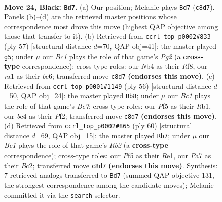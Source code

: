 \documentclass[11pt]{article}
\begin{document}
\clearpage

\begin{figure}[p]\centering
\begin{subfigure}{0.46\textwidth}\centering
\resizebox{\linewidth}{!}{%
\newchessgame
\chessboard[
  setfen={r1b4k/ppb3pp/5n2/P4p2/1nB2P2/1P2P1P1/8/RNB2RK1 b - - 8 24},
  showmover=false,
  pgfstyle=straightmove, color=movearrow, markmove={c8-d7}
]}
\caption{}
\end{subfigure}\hfill
\begin{subfigure}{0.46\textwidth}\centering
\resizebox{\linewidth}{!}{%
\newchessgame
\chessboard[
  setfen={5rk1/5ppp/1pB1p3/pPb1P3/5n2/2P4P/2P3P1/R3R2K b - - 1 29},
  showmover=false,
  pgfstyle=straightmove, color=movearrow, markmove={g7-g5}
]}
\caption{}
\end{subfigure}
\\[4pt]
\begin{subfigure}{0.46\textwidth}\centering
\resizebox{\linewidth}{!}{%
\newchessgame
\chessboard[
  setfen={r1b5/p1B1pr1k/5b1p/P1NR1p2/6p1/4P3/5PPP/1R4K1 w - - 1 29},
  showmover=false,
  pgfstyle=straightmove, color=movearrow, markmove={c7-b8}
]}
\caption{}
\end{subfigure}\hfill
\begin{subfigure}{0.46\textwidth}\centering
\resizebox{\linewidth}{!}{%
\newchessgame
\chessboard[
  setfen={r3r1k1/p2n1p2/2ppb1p1/7p/P3P2P/2K1B3/1RB2PP1/4R3 w - - 0 31},
  showmover=false,
  pgfstyle=straightmove, color=movearrow, markmove={b2-b7}
]}
\caption{}
\end{subfigure}
\caption{\textbf{Move 24, Black: \texttt{Bd7}.} (a) Our position; Melanie plays \texttt{Bd7} (\texttt{c8d7}). Panels (b)--(d) are the retrieved master positions whose correspondence most drove this move (highest QAP objective among those that transfer to it). (b) Retrieved from \texttt{ccrl\_top\_p0002\#833} (ply 57) [structural distance $d$=70, QAP obj=41]: the master played \texttt{g5}; under $\mu$ our \emph{Bc1} plays the role of that game's \emph{Pg2} (a \textbf{cross-type} correspondence); cross-type roles: our \emph{N}b4 as their \emph{R}f8, our \emph{r}a1 as their \emph{b}c6; transferred move \texttt{c8d7} \textbf{(endorses this move)}. (c) Retrieved from \texttt{ccrl\_top\_p0001\#1149} (ply 56) [structural distance $d$=50, QAP obj=24]: the master played \texttt{Bb8}; under $\mu$ our \emph{Bc1} plays the role of that game's \emph{Bc7}; cross-type roles: our \emph{P}f5 as their \emph{R}b1, our \emph{b}c4 as their \emph{P}f2; transferred move \texttt{c8d7} \textbf{(endorses this move)}. (d) Retrieved from \texttt{ccrl\_top\_p0002\#865} (ply 60) [structural distance $d$=69, QAP obj=15]: the master played \texttt{Rb7}; under $\mu$ our \emph{Bc1} plays the role of that game's \emph{Rb2} (a \textbf{cross-type} correspondence); cross-type roles: our \emph{P}f5 as their \emph{R}e1, our \emph{P}a7 as their \emph{B}c2; transferred move \texttt{c8d7} \textbf{(endorses this move)}. Synthesis: 7 retrieved analogs transferred to \texttt{Bd7} (summed QAP objective 131, the strongest correspondence among the candidate moves); Melanie committed it via the \texttt{search} selector.}
\label{fig:thought-m47}
\end{figure}
\end{document}
